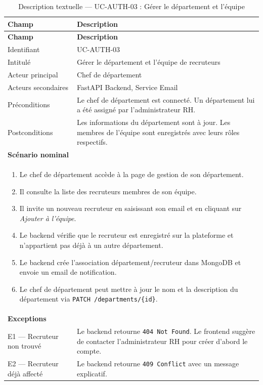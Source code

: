 \renewcommand{\arraystretch}{1.4}
\begin{longtable}{|p{4cm}|p{10cm}|}
\caption{Description textuelle — UC-AUTH-03 : Gérer le département et l'équipe}
\label{tab:uc_auth03} \\
\hline
\rowcolor[HTML]{EFEFEF} \textbf{Champ} & \textbf{Description} \\ \hline
\endfirsthead
\hline
\rowcolor[HTML]{EFEFEF} \textbf{Champ} & \textbf{Description} \\ \hline
\endhead
\hline
\endfoot
\hline
\endlastfoot
Identifiant & UC-AUTH-03 \\ \hline
Intitulé & Gérer le département et l'équipe de recruteurs \\ \hline
Acteur principal & Chef de département \\ \hline
Acteurs secondaires & FastAPI Backend, Service Email \\ \hline
Préconditions & Le chef de département est connecté. Un département lui a été assigné par l'administrateur RH. \\ \hline
Postconditions & Les informations du département sont à jour. Les membres de l'équipe sont enregistrés avec leurs rôles respectifs. \\ \hline
\multicolumn{2}{|l|}{\textbf{Scénario nominal}} \\ \hline
\multicolumn{2}{|p{14.5cm}|}{
\vspace{2pt}
\begin{enumerate}
    \item Le chef de département accède à la page de gestion de son département.
    \item Il consulte la liste des recruteurs membres de son équipe.
    \item Il invite un nouveau recruteur en saisissant son email et en cliquant sur \textit{Ajouter à l'équipe}.
    \item Le backend vérifie que le recruteur est enregistré sur la plateforme et n'appartient pas déjà à un autre département.
    \item Le backend crée l'association département/recruteur dans MongoDB et envoie un email de notification.
    \item Le chef de département peut mettre à jour le nom et la description du département via \texttt{PATCH /departments/\{id\}}.
\end{enumerate}
\vspace{2pt}
} \\ \hline
\multicolumn{2}{|l|}{\textbf{Exceptions}} \\ \hline
E1 — Recruteur non trouvé & Le backend retourne \texttt{404 Not Found}. Le frontend suggère de contacter l'administrateur RH pour créer d'abord le compte. \\ \hline
E2 — Recruteur déjà affecté & Le backend retourne \texttt{409 Conflict} avec un message explicatif. \\ \hline
\end{longtable}
\renewcommand{\arraystretch}{1}


